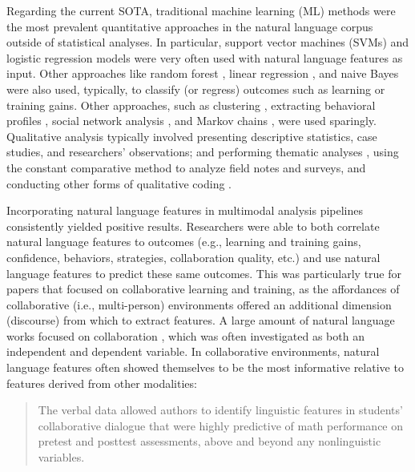 \documentclass[manuscript,screen,review]{acmart}
\begin{document}
Regarding the current SOTA, traditional machine learning (ML) methods were the most prevalent quantitative approaches in the natural language corpus outside of statistical analyses. In particular, support vector machines (SVMs) \cite{3754172825,85990093,1637690235} and logistic regression models \cite{957160695,3796180663,1576545447} were very often used with natural language features as input. Other approaches like random forest \cite{2273914836}, linear regression \cite{1118315889}, and naive Bayes \cite{1637690235} were also used, typically, to classify (or regress) outcomes such as learning or training gains. Other approaches, such as clustering \cite{2273914836}, extracting behavioral profiles \cite{2273914836}, social network analysis \cite{2345021698}, and Markov chains \cite{3135645357}, were used sparingly. Qualitative analysis typically involved presenting descriptive statistics, case studies, and researchers' observations; and performing thematic analyses \cite{braun2012thematic}, using the constant comparative method \cite{glaser1965constant} to analyze field notes and surveys, and conducting other forms of qualitative coding \cite{2497456347,1847468084,1296637108}.

Incorporating natural language features in multimodal analysis pipelines consistently yielded positive results. Researchers were able to both correlate natural language features to outcomes (e.g., learning and training gains, confidence, behaviors, strategies, collaboration quality, etc.) and use natural language features to predict these same outcomes. This was particularly true for papers that focused on collaborative learning and training, as the affordances of collaborative (i.e., multi-person) environments offered an additional dimension (discourse) from which to extract features. A large amount of natural language works focused on collaboration \cite{1118315889,3095923626,1637690235}, which was often investigated as both an independent and dependent variable. In collaborative environments, natural language features often showed themselves to be the most informative relative to features derived from other modalities:

\begin{quote}
    The verbal data allowed authors to identify linguistic features in students' collaborative dialogue that were highly predictive of math performance on pretest and posttest assessments, above and beyond any nonlinguistic variables. \cite{3796180663}
\end{quote}
\end{document}
